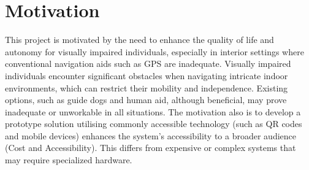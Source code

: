 \section{Motivation}
This project is motivated by the need to enhance the quality of life and autonomy for visually impaired individuals, especially in interior settings where conventional navigation aids such as GPS are inadequate. Visually impaired individuals encounter significant obstacles when navigating intricate indoor environments, which can restrict their mobility and independence. Existing options, such as guide dogs and human aid, although beneficial, may prove inadequate or unworkable in all situations.
The motivation also is to develop a prototype solution utilising commonly accessible technology (such as QR codes and mobile devices) enhances the system's accessibility to a broader audience (Cost and Accessibility). This differs from expensive or complex systems that may require specialized hardware.
